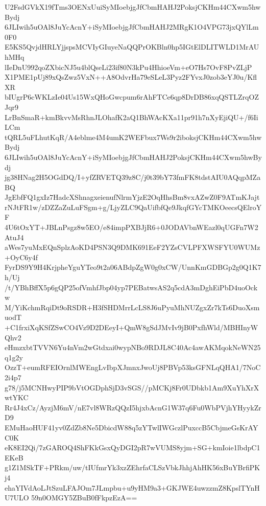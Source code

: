 U2FsdGVkX19fTms3OENxUuiSyMIoebjgJfCbmHAHJ2PoksjCKHm44CXwm5hwBydj
6JLIwih5uOAl8JuYcAcnY+iSyMIoebjgJfCbmHAHJ2MRgK1O4VPG73jxQYlLm0F0
E5KS5QvjdHRLYjjspsMCVIyGIuyeNaQQPrOKBln0hp5IGtElDLITWLD1MrAUhMHq
lIeDnU992qoZXbicNJ5u4blQseLi23if80N3kPu4HhioeVm+eO7Hs7OvF8PvZLjP
X1PME1pUj89xQsZwz5VxN++A8OdvrHa79eSLeL3Pyz2FYvxJ0zob3eYJ0u/KflXR
bIUgrP6cWKLzIe04Us15WxQHoGwcpum6rAhFTCe6qp8DrDB86xqQSTLZrqOZJqr9
LrBnSmaR+kmBkvvMsRhnJLOhafK2aQ1BhWAcKXa11pr91h7nXyEjiQU+/f6IiLCm
tQRL5uFLhutKqR/A4eblme4M4umK2WEFbux7Ws9r2iboksjCKHm44CXwm5hwBydj
6JLIwih5uOAl8JuYcAcnY+iSyMIoebjgJfCbmHAHJ2PoksjCKHm44CXwm5hwBydj
jg38HNag2H5OGdDQ/I+yfZRVETQ39z8C/j0t39bY73fmFK8tdstAIU0AQqpMZaBQ
JgEbfFQ1gxIz7HadcXShnagxeienufNlrmYjzE2OqHhsBm8vxAZwZ0F9ATmKJajt
rNJtFR1w/zDZZaZuLuFSgm+g/LjyZLC9QaUifbfQe9JkqfGYcTMKOeecsQElroYF
4U6tOxYT+JBLnPsgz8w5EO/e84impPXBJjR6+0JODAVbnWEazl0qUGFn7W2AtuJ4
aWes7yuMxEQnSplzAoKD4PSN3Q9DMK691EeF2YZsCVLPFXWSFYU0WUMz+OyC6y4f
FyrDS9Y9H4KrjpheYguYTeo9t2a06ABdpZgW0g0xCW/UnnKmGDBGp2g0Q1K7h/Uj
/t/YBhBffX5p6gQP25ofVmhfJbp04yp7PEBatwsAS2q5cdA3mDghEiPbD4uoOckw
M/YiKchmRqiDt9oRSDR+H3fSHDMrrLcLS8J6uPyuMhNUZgxZr7kTs6DuoXsmuodT
+C1frxiXqKSfZSwCO4Vz9D2DEeyI+QmW8gSdJMvIv9jB0PxfhWld/MBHInyWQhv2
eHmzxbtTVVN6Yu4nVm2wGtdxai0wypNBo9RDJL8C40Ac4awAKMqokNeWN25q1g2y
OzzT+eumRFEIOrnlMWEngLvIbpXJmnxJwoUj8PBVp53ksGFNLqQHA1/7NoC2i4p7
g78/j5MCNHwyPIP9bVtOGDphSjD3vSGS//pMCKj8Fr0UDbkb1Am9XuYhXrXwtYKC
Rr4J4xCz/AyzjM6mV/nE7vl8WRzQQzI5hjxbAcnG1W37q6Fu0WbPVjhYHyykZrD9
EMuHaoHUF41yv0ZdZb8Ne5DbicdW88q5zYTwlIWGczlPuxccB5CbjmeGsKrAYC0K
eK8EI2Qi/7zGAROQ4ShFKkGsxQyDGI2pR7wVUMS8yjm+SG+kmIoie1lbdpC1EKeB
g1Z1MSkTF+PRkm/uw/tIUfmrYk3xzZEhrfaCLSzVbkJhhjAhHK56xBuYBrfiPKj4
ehaYIVdAoLJtSzuLFAJOm7JLmpbu+u9yHM9a3+GKJWE4uwzzmZ8KpslTYnHU7ULO
59n0OMGY5ZBuB0fFkpzEzA==

